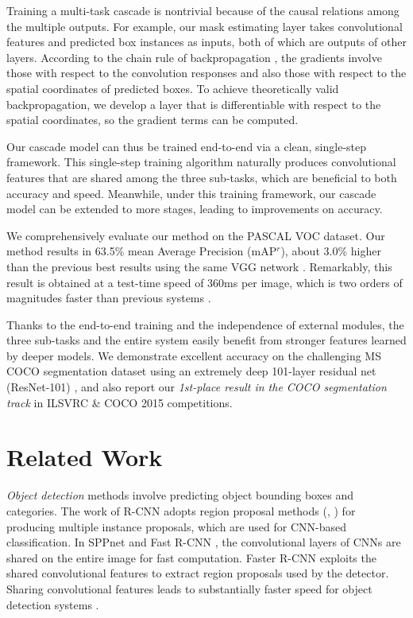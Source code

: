 \documentclass[10pt,twocolumn,letterpaper]{article}
\begin{document}
Training a multi-task cascade is nontrivial because of the causal relations among the multiple outputs. For example, our mask estimating layer takes convolutional features and predicted box instances as inputs, both of which are outputs of other layers. According to the chain rule of backpropagation \cite{LeCun1989}, the gradients involve those with respect to the convolution responses and also those with respect to the spatial coordinates of predicted boxes. To achieve theoretically valid backpropagation, we develop a layer that is differentiable with respect to the spatial coordinates, so the gradient terms can be computed.

Our cascade model can thus be trained end-to-end via a clean, single-step framework. This single-step training algorithm naturally produces convolutional features that are shared among the three sub-tasks, which are beneficial to both accuracy and speed. Meanwhile, under this training framework, our cascade model can be extended to more stages, leading to improvements on accuracy.

We comprehensively evaluate our method on the PASCAL VOC dataset. Our method results in 63.5\% mean Average Precision (mAP$^r$), about 3.0\% higher than the previous best results \cite{Hariharan2015,Dai2015} using the same VGG network \cite{Simonyan2015}. Remarkably, this result is obtained at a test-time speed of 360ms per image, which is two orders of magnitudes faster than previous systems \cite{Hariharan2015,Dai2015}.

Thanks to the end-to-end training and the independence of external modules, the three sub-tasks and the entire system easily benefit from stronger features learned by deeper models. We demonstrate excellent accuracy on the challenging MS COCO segmentation dataset using an extremely deep 101-layer residual net (ResNet-101) \cite{He2015a}, and also report our \emph{1st-place result in the COCO segmentation track} in ILSVRC \& COCO 2015 competitions.


\section{Related Work}

\emph{Object detection} methods \cite{Girshick2014,He2014,Girshick2015,Ren2015} involve predicting object bounding boxes and categories. The work of R-CNN \cite{Girshick2014} adopts region proposal methods (\eg, \cite{Uijlings2013,Zitnick2014}) for producing multiple instance proposals, which are used for CNN-based classification. In SPPnet \cite{He2014} and Fast R-CNN \cite{Girshick2015}, the convolutional layers of CNNs are shared on the entire image for fast computation. Faster R-CNN \cite{Ren2015} exploits the shared convolutional features to extract region proposals used by the detector. Sharing convolutional features leads to substantially faster speed for object detection systems \cite{He2014,Girshick2015,Ren2015}.
\end{document}
